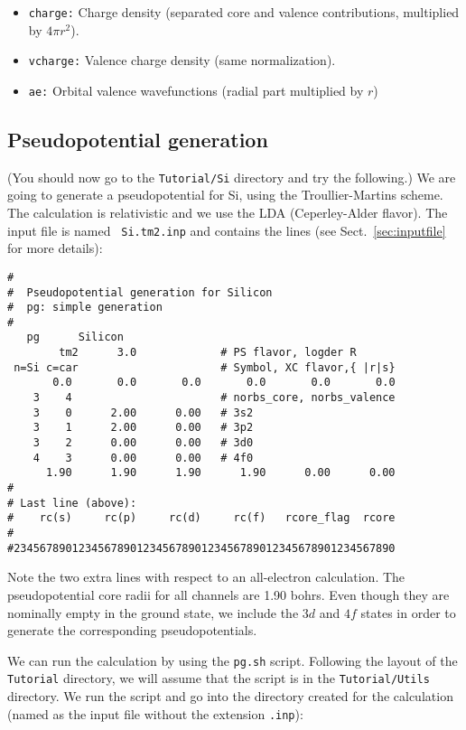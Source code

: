 \documentclass[11pt]{article}
\begin{document}
\begin{itemize}
\item {\tt charge:} Charge density (separated core and valence
contributions, multiplied by $4\pi r^2$). 
\item {\tt vcharge:} Valence charge density (same normalization).
\item {\tt ae:} Orbital valence wavefunctions (radial part multiplied by $r$)
\end{itemize}

\subsection{Pseudopotential generation}

(You should now go to the {\tt Tutorial/Si} directory and try the
following.)  We are going to generate a pseudopotential for Si, using
the Troullier-Martins scheme. The calculation is relativistic and we
use the LDA (Ceperley-Alder flavor). The input file is named {\tt
Si.tm2.inp} and contains the lines (see Sect.~\ref{sec:inputfile} for more
details):

\begin{verbatim}
#
#  Pseudopotential generation for Silicon
#  pg: simple generation
#
   pg      Silicon
        tm2      3.0             # PS flavor, logder R
 n=Si c=car                      # Symbol, XC flavor,{ |r|s}
       0.0       0.0       0.0       0.0       0.0       0.0
    3    4                       # norbs_core, norbs_valence
    3    0      2.00      0.00   # 3s2
    3    1      2.00      0.00   # 3p2
    3    2      0.00      0.00   # 3d0
    4    3      0.00      0.00   # 4f0
      1.90      1.90      1.90      1.90      0.00      0.00
#
# Last line (above): 
#    rc(s)     rc(p)     rc(d)     rc(f)   rcore_flag  rcore
#
#23456789012345678901234567890123456789012345678901234567890
\end{verbatim}

Note the two extra lines with respect to an all-electron calculation.
The pseudopotential core radii for all channels are 1.90 bohrs. Even
though they are nominally empty in the ground state, we include the
$3d$ and $4f$ states in order to generate the corresponding
pseudopotentials. 

We can run the calculation by using the {\tt pg.sh} script. Following
the layout of the {\tt Tutorial} directory, we will assume that the
script is in the {\tt Tutorial/Utils} directory. We run the
script and go into the directory created for the calculation (named
as the input file without the extension {\tt .inp}):
\end{document}
